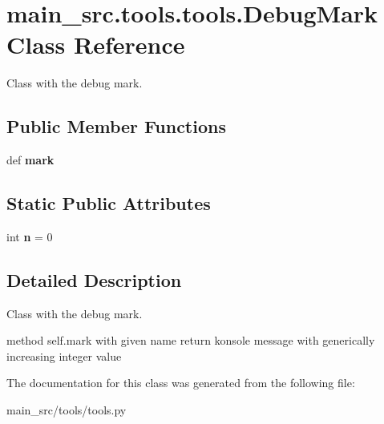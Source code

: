 \hypertarget{classmain__src_1_1tools_1_1tools_1_1DebugMark}{\section{main\-\_\-src.\-tools.\-tools.\-Debug\-Mark Class Reference}
\label{classmain__src_1_1tools_1_1tools_1_1DebugMark}
}


Class with the debug mark.  


\subsection*{Public Member Functions}
\begin{DoxyCompactItemize}
\item 
\hypertarget{classmain__src_1_1tools_1_1tools_1_1DebugMark_a3d9589f643e90dc61ed4bf121707bdd8}{def {\bfseries mark}}\label{classmain__src_1_1tools_1_1tools_1_1DebugMark_a3d9589f643e90dc61ed4bf121707bdd8}

\end{DoxyCompactItemize}
\subsection*{Static Public Attributes}
\begin{DoxyCompactItemize}
\item 
\hypertarget{classmain__src_1_1tools_1_1tools_1_1DebugMark_a645e70b40f50c2b292f1db9fc5e758a5}{int {\bfseries n} = 0}\label{classmain__src_1_1tools_1_1tools_1_1DebugMark_a645e70b40f50c2b292f1db9fc5e758a5}

\end{DoxyCompactItemize}


\subsection{Detailed Description}
Class with the debug mark. 

method self.\-mark with given name return konsole message with generically increasing integer value 

The documentation for this class was generated from the following file\-:\begin{DoxyCompactItemize}
\item 
main\-\_\-src/tools/tools.\-py\end{DoxyCompactItemize}
